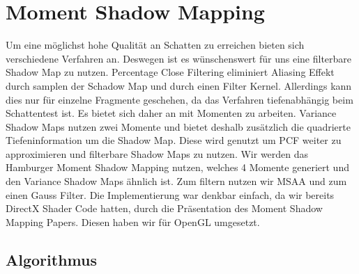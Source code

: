 \documentclass[runningheaders,a4paper]{llncs}
\begin{document}
\section{Moment Shadow Mapping}
Um eine möglichst hohe Qualität an Schatten zu erreichen bieten sich verschiedene Verfahren an. Deswegen ist es wünschenswert für uns eine filterbare Shadow Map zu nutzen. 
Percentage Close Filtering eliminiert Aliasing Effekt durch samplen der Schadow Map und durch einen Filter Kernel.\cite{reeves1987rendering}
Allerdings kann dies nur für einzelne Fragmente geschehen, da das Verfahren tiefenabhängig beim Schattentest ist.\cite{reeves1987rendering}
Es bietet sich daher an mit Momenten zu arbeiten. Variance Shadow Maps nutzen zwei Momente und bietet deshalb zusätzlich die quadrierte Tiefeninformation um die Shadow Map. Diese wird genutzt um PCF weiter zu approximieren und filterbare Shadow Maps zu nutzen.\cite{donnelly2006variance}
Wir werden das Hamburger Moment Shadow Mapping nutzen, welches 4 Momente generiert und den Variance Shadow Maps ähnlich ist. Zum filtern nutzen wir MSAA und zum einen Gauss Filter. Die Implementierung war denkbar einfach, da wir bereits DirectX Shader Code hatten, durch die Präsentation des Moment Shadow Mapping Papers\cite{msm}. Diesen haben wir für OpenGL umgesetzt.

\subsection{Algorithmus}
\end{document}
